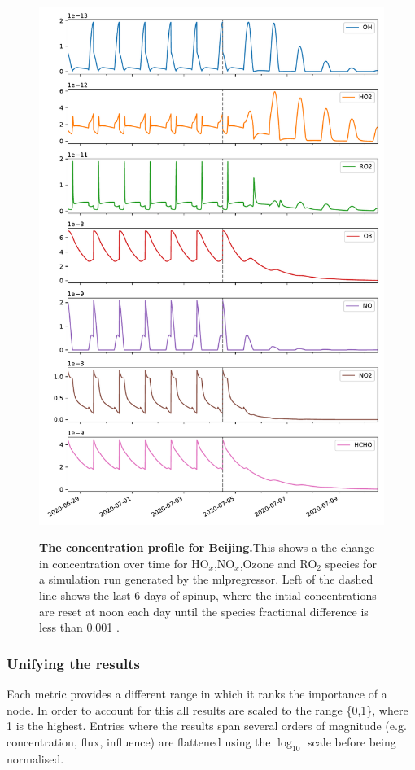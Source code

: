 \begin{figure}[H]
    \centering
\includegraphics[width=.9\textwidth]{figures_c3/mlpregressor/conc_beijing.pdf}
\label{fig:cbeijing}
\caption{\textbf{The concentration profile for Beijing.}This shows a the change in concentration over time for HO$_x$,NO$_x$,Ozone and RO$_2$ species for a simulation run generated by the mlpregressor. Left of the dashed line shows the last 6 days of spinup, where the intial concentrations are reset at noon each day until the species fractional difference is less than 0.001 .}
\end{figure}

\newpage





\subsubsection{Unifying the results}
Each metric provides a different range in which it ranks the importance of a node. In order to account for this all results are scaled to the range \{0,1\}, where 1 is the highest. Entries where the results span several orders of magnitude (e.g. concentration, flux, influence) are flattened using the $\log_{10}$ scale before being normalised. 



